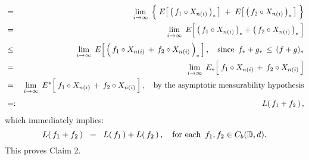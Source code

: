 \begin{eqnarray*}
\\
& \overset{{\color{white}1}}{=} &
	\underset{i\rightarrow\infty}{\lim}\;\left\{\;
	E\!\left[\,\left(\,f_{1} \circ X_{n(i)}\,\right)_{*} \,\right]
	\; \overset{{\color{white}.}}{+} \;
	E\!\left[\,\left(\,f_{2} \circ X_{n(i)}\,\right)_{*} \,\right]
	\;\right\}
\\
& \overset{{\color{white}1}}{=} &
	\underset{i\rightarrow\infty}{\lim}\;\,
	E\!\left[\,
		\left(\,f_{1} \circ X_{n(i)}\,\right)_{*}
		\overset{{\color{white}.}}{+}
		\left(\,f_{2} \circ X_{n(i)}\,\right)_{*}
	\,\right]
\\
& \overset{{\color{white}1}}{\leq} &
	\underset{i\rightarrow\infty}{\lim}\;\,
	E\!\left[\,\left(\,f_{1} \circ X_{n(i)} \,\overset{{\color{white}.}}{+}\, f_{2} \circ X_{n(i)} \,\right)_{*} \,\right],
	\quad
	\textnormal{since \,$f_{*} +  g_{*} \,\leq\, (f + g)_{*}$}
\\
& \overset{{\color{white}1}}{=} &
	\underset{i\rightarrow\infty}{\lim}\;\,
	E_{*}\!\left[\;f_{1} \circ X_{n(i)} \,\overset{{\color{white}.}}{+}\, f_{2} \circ X_{n(i)} \,\right]
\\
& \overset{{\color{white}1}}{=} &
	\underset{i\rightarrow\infty}{\lim}\;\,
	E^{*}\!\left[\;f_{1} \circ X_{n(i)} \,\overset{{\color{white}.}}{+}\, f_{2} \circ X_{n(i)} \,\right],
	\quad\textnormal{by the asymptotic measurability hypothesis}
\\
& \overset{{\color{white}1}}{=:} &
	L(\,f_{1} + f_{2}\,)\,,
\end{eqnarray*}
which immediately implies:
\begin{equation*}
L(\,f_{1} + f_{2}\,) \;\; = \;\; L(\,f_{1}\,) + L(\,f_{2}\,)\,,
\quad
\textnormal{for each \,$f_{1}, f_{2} \in C_{b}(\mathbb{D},d)$}.
\end{equation*}
This proves Claim 2.

